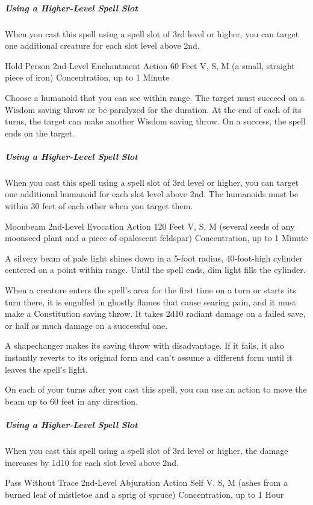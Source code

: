 \documentclass[letterpaper,openany,oneside,twocolumn]{book}
\begin{document}
\subparagraph*{Using a Higher-Level Spell Slot} When you cast this spell using a spell slot of 3rd level or higher, you can target one additional creature for each slot level above 2nd.

\DndSpellHeader
  {Hold Person}
  {2nd-Level Enchantment}
  {Action}
  {60 Feet}
  {V, S, M (a small, straight piece of iron)}
  {Concentration, up to 1 Minute}

Choose a humanoid that you can see within range. The target must succeed on a Wisdom saving throw or be paralyzed for the duration. At the end of each of its turns, the target can make another Wisdom saving throw. On a success, the spell ends on the target.

\subparagraph*{Using a Higher-Level Spell Slot} When you cast this spell using a spell slot of 3rd level or higher, you can target one additional humanoid for each slot level above 2nd. The humanoids must be within 30 feet of each other when you target them.

\DndSpellHeader
  {Moonbeam}
  {2nd-Level Evocation}
  {Action}
  {120 Feet}
  {V, S, M (several seeds of any moonseed plant and a piece of opalescent feldspar)}
  {Concentration, up to 1 Minute}

A silvery beam of pale light shines down in a 5-foot radius, 40-foot-high cylinder centered on a point within range. Until the spell ends, dim light fills the cylinder.

When a creature enters the spell's area for the first time on a turn or starts its turn there, it is engulfed in ghostly flames that cause searing pain, and it must make a Constitution saving throw. It takes 2d10 radiant damage on a failed save, or half as much damage on a successful one.

A shapechanger makes its saving throw with disadvantage. If it fails, it also instantly reverts to its original form and can't assume a different form until it leaves the spell's light.

On each of your turns after you cast this spell, you can use an action to move the beam up to 60 feet in any direction.

\subparagraph*{Using a Higher-Level Spell Slot} When you cast this spell using a spell slot of 3rd level or higher, the damage increases by 1d10 for each slot level above 2nd.

\DndSpellHeader
  {Pass Without Trace}
  {2nd-Level Abjuration}
  {Action}
  {Self}
  {V, S, M (ashes from a burned leaf of mistletoe and a sprig of spruce)}
  {Concentration, up to 1 Hour}
\end{document}
